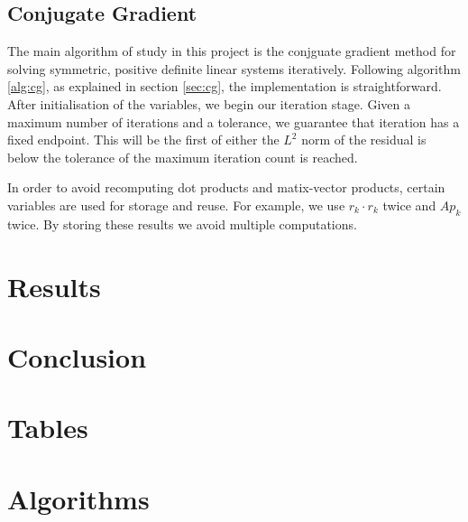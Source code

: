 \subsection{Conjugate Gradient}

The main algorithm of study in this project is the conjguate gradient method for solving symmetric, positive definite linear systems iteratively.
Following algorithm \ref{alg:cg}, as explained in section \ref{sec:cg}, the implementation is straightforward.
After initialisation of the variables, we begin our iteration stage. 
Given a maximum number of iterations and a tolerance, we guarantee that iteration has a fixed endpoint.
This will be the first of either the $L^{2}$ norm of the residual is below the tolerance of the maximum iteration count is reached.

In order to avoid recomputing dot products and matix-vector products, certain variables are used for storage and reuse.
For example, we use $r_k \cdot r_k$ twice and $A p_k$ twice. By storing these results we avoid multiple computations.


\section{Results}

\iffalse
Results:
Graphs, errors, convergence rates,
\fi


\section{Conclusion}

\iffalse
    Conclusion draws together strands of work throughout the report, 
    demonstrating how the results obtained relate to each other and 
    the broader context of the mathematical problem.

Discussion of results in context of problem
Talk about related algorithms
> BiCG
> CG squared
Preconditioning
Parallelisation, optimisations
Results
\fi

\clearpage
\appendix
\section{Tables}


\section{Algorithms}


